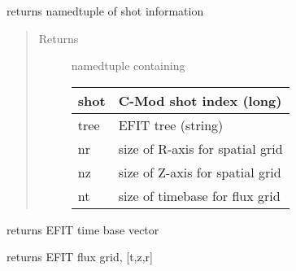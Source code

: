 \documentclass[letterpaper,10pt,english]{sphinxmanual}
\begin{document}
\begin{fulllineitems}
\begin{fulllineitems}
\end{fulllineitems}


\begin{fulllineitems}
\label{eqtools:eqtools.EFIT.EFITTree.getInfo}
returns namedtuple of shot information
\begin{quote}\begin{description}
\item[{Returns}] \leavevmode

namedtuple containing

\begin{tabulary}{\linewidth}{|L|L|}
\hline

shot
 & 
C-Mod shot index (long)
\\\hline

tree
 & 
EFIT tree (string)
\\\hline

nr
 & 
size of R-axis for spatial grid
\\\hline

nz
 & 
size of Z-axis for spatial grid
\\\hline

nt
 & 
size of timebase for flux grid
\\\hline
\end{tabulary}



\end{description}\end{quote}

\end{fulllineitems}


\begin{fulllineitems}
\label{eqtools:eqtools.EFIT.EFITTree.getTimeBase}
returns EFIT time base vector

\end{fulllineitems}


\begin{fulllineitems}
\label{eqtools:eqtools.EFIT.EFITTree.getFluxGrid}
returns EFIT flux grid, {[}t,z,r{]}

\end{fulllineitems}


\end{fulllineitems}
\end{document}
